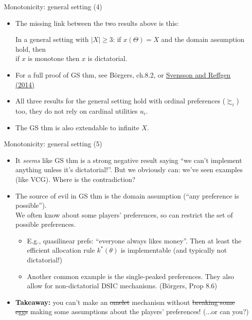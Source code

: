 \documentclass[english,10pt
,aspectratio=169
]{beamer}
\begin{document}
\begin{frame}{Monotonicity: general setting (4)}
	\begin{itemize}
		\item The missing link between the two results above is this:
		\begin{theorem}
			In a general setting with $|X|\geq 3$: if $x(\Theta)=X$ and the domain assumption hold, then\\
			\centering
			if $x$ is monotone then $x$ is dictatorial.
		\end{theorem}
		\item For a full proof of GS thm, see B{\"o}rgers, ch.8.2, or \href{http://dx.doi.org/10.1016/j.jmateco.2014.09.007}{\uline{Svensson and Reffgen (2014)}}
		\item All three results for the general setting hold with ordinal preferences ($\succsim_i$) too, they do not rely on cardinal utilities $u_i$.
		\item The GS thm is also extendable to infinite $X$.
	\end{itemize}
\end{frame}


\begin{frame}{Monotonicity: general setting (5)}
	\begin{itemize}
		\item It \emph{seems} like GS thm is a strong negative result saying ``we can't implement anything unless it's dictatorial!''. But we obviously can: we've seen examples (like VCG). Where is the contradiction?
		\item The source of evil in GS thm is the \alert{domain} assumption (``any preference is possible''). \\
		We often know  about some players' preferences, so can restrict the set of possible preferences.
		\begin{itemize}
			\item E.g., quasilinear prefs: ``everyone always likes money''. Then at least the efficient allocation rule $k^*(\theta)$ is implementable (and typically not dictatorial!)
			\item Another common example is the single-peaked preferences. They also allow for non-dictatorial DSIC mechanisms. (B{\"o}rgers, Prop 8.6)
		\end{itemize}
		\item \textbf{Takeaway:} you can't make an \sout{omelet} mechanism without \sout{breaking some eggs} making some assumptions about the players' preferences! (...or can you?)
	\end{itemize}
\end{frame}
\end{document}

